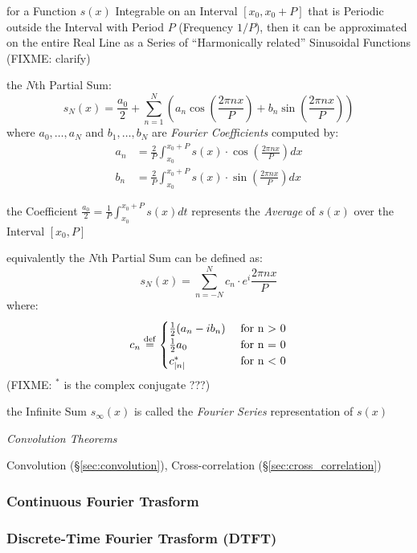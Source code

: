 for a Function $s(x)$ Integrable on an Interval $[x_0,x_0 + P]$ that is
Periodic outside the Interval with Period $P$ (Frequency $1/P$), then it can be
approximated on the entire Real Line as a Series of ``Harmonically related''
Sinusoidal Functions (FIXME: clarify)

the $N$th Partial Sum:
\[
  s_N(x) = \frac{a_0}{2} + \sum_{n=1}^N \left(
    a_n\cos(\frac{2\pi{nx}}{P}) + b_n\sin(\frac{2\pi{nx}}{P})
  \right)
\]
where $a_0,\ldots,a_N$ and $b_1,\ldots,b_N$ are \emph{Fourier Coefficients}
computed by:
\begin{align*}
  a_n & = \frac{2}{P}\int_{x_0}^{x_0+P}s(x) \cdot \cos(\frac{2\pi{nx}}{P}) dx \\
  b_n & = \frac{2}{P}\int_{x_0}^{x_0+P}s(x) \cdot \sin(\frac{2\pi{nx}}{P}) dx
\end{align*}

the Coefficient $\frac{a_0}{2} = \frac{1}{P}\int_{x_0}^{x_0+P}s(x)dt$
represents the \emph{Average} of $s(x)$ over the Interval $[x_0,P]$

equivalently the $N$th Partial Sum can be defined as:
\[
  s_N(x) = \sum_{n=-N}^N c_n \cdot e^i\frac{2\pi{nx}}{P}
\]
where:
\[
  c_n \stackrel{\mathrm{def}}= \begin{cases}
    \frac{1}{2}(a_n - ib_n) &\ \text{for n > 0} \\
    \frac{1}{2}a_0          &\ \text{for n = 0} \\
    c_{|n|}^*               &\ \text{for n < 0}
  \end{cases}
\]
(FIXME: $^*$ is the complex conjugate ???)

the Infinite Sum $s_\infty(x)$ is called the \emph{Fourier Series}
representation of $s(x)$


\emph{Convolution Theorems}

Convolution (\S\ref{sec:convolution}), Cross-correlation
(\S\ref{sec:cross_correlation})



\subsubsection{Continuous Fourier Trasform}
\label{sec:continuous_fourier_transform}

\subsubsection{Discrete-Time Fourier Trasform (DTFT)}\label{sec:dtft}



